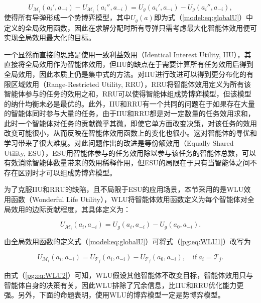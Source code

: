 \begin{equation}
\label{pg:eq:pgU}
	U_{\mathcal{M}_i}(a_i',a_{-i})-U_{\mathcal{M}_i}(a_i'',a_{-i})=U_g(a_i',a_{-i})-U_g(a_i'',a_{-i}),
\end{equation}
使得所有导弹形成一个势博弈模型，其中$U_g(a)$即为式（\ref{model:eq:globalU}）中定义的全局效用函数，因此在求解分配时所有导弹只需考虑最大化智能体效用便可实现全局效用最大化的目标。

一个显然而直接的思路是使用一致利益效用（Identical Interest Utility, IIU），其直接将全局效用作为智能体效用，但IIU的缺点在于需要计算所有任务效用后得到全局效用，因此本质上仍是集中式的方法。对IIU进行改进可以得到更分布化的有限区域效用（Range-Restricted Utility, RRU），RRU将智能体效用定义为所有该智能体参与的任务的效用之和，RRU可以使得智能体组成势博弈模型，但该模型的纳什均衡未必是最优的。此外，IIU和RRU有一个共同的问题在于如果存在大量的智能体同时参与大量的任务，由于IIU和RRU都是对一定数量的任务效用求和，此时一个智能体对任务的贡献微乎其微，即使它单方面改变决策，对该任务的效用改变可能很小，从而反映在智能体效用函数上的变化也很小。这对智能体的寻优和学习带来了很大难度。对此问题作出的改进是等份额效用（Equally Shared Utility, ESU），ESU用智能体参与的任务效用除以参与该任务的智能体总数，可以有效消除智能体数量带来的效用稀释作用，但ESU的局限在于只有当智能体之间不存在区别时才可以组成势博弈模型。

为了克服IIU和RRU的缺陷，且不局限于ESU的应用场景，本节采用的是WLU效用函数（Wonderful Life Utility），WLU将智能体效用函数定义为每个智能体对全局效用的边际贡献程度，其具体定义为：

\begin{equation}
\label{pg:eq:WLU1}
	U_{\mathcal{M}_i}(a_i,a_{-i}) = U_g(a_i,a_{-i}) - U_g(a_0,a_{-i}).
\end{equation}

由全局效用函数的定义式（\ref{model:eq:globalU}）可将式（\ref{pg:eq:WLU1}）改写为

\begin{equation}
\label{pg:eq:WLU2}
	U_{\mathcal{M}_i}(a_i,a_{-i}) = U_{\mathcal{T}_j}(a_i,a_{-i}) - U_{\mathcal{T}_j}(a_0,a_{-i}),\quad \text{if}\ a_i=\mathcal{T}_j.
\end{equation}

由式（\ref{pg:eq:WLU2}）可知，WLU假设其他智能体不改变目标，智能体效用只与智能体自身的决策有关，因此WLU排除了冗余信息，比IIU和RRU优化能力更强。另外，下面的命题表明，使用WLU的博弈模型一定是势博弈模型。

